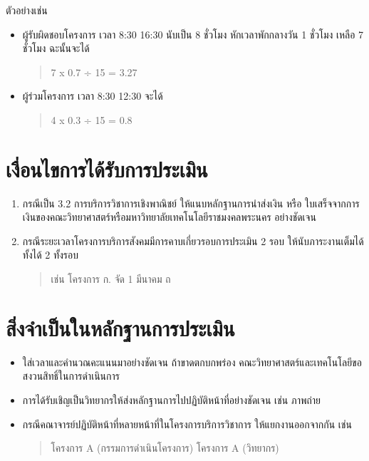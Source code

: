 \documentclass[a4paper,12pt,english]{sphinxmanual}
\begin{document}
ตัวอย่างเช่น
\begin{itemize}
\item {} 
ผู้รับผิดชอบโครงการ เวลา 8:30 \sphinxhyphen{} 16:30 นับเป็น 8 ชั่วโมง หักเวลาพักกลางวัน 1 ชั่วโมง เหลือ 7 ชั่วโมง ฉะนั้นจะได้
\begin{quote}

7 x 0.7 ÷ 15 = 3.27
\end{quote}

\item {} 
ผู้ร่วมโครงการ เวลา 8:30 \sphinxhyphen{} 12:30 จะได้
\begin{quote}

4 x 0.3 ÷ 15 = 0.8
\end{quote}

\end{itemize}


\section{เงื่อนไขการได้รับการประเมิน}
\label{\detokenize{3service:id3}}\begin{enumerate}
%
\item {} 
กรณีเป็น 3.2 การบริการวิชาการเชิงพาณิชย์ ให้แนบหลักฐานการนำส่งเงิน หรือ ใบเสร็จจากการเงินของคณะวิทยาศาสตร์หรือมหาวิทยาลัยเทคโนโลยีราชมงคลพระนคร อย่างชัดเจน

\item {} 
กรณีระยะเวลาโครงการบริการสังคมมีการคาบเกี่ยวรอบการประเมิน 2 รอบ ให้นับภาระงานเต็มได้ทั้งได้ 2 ทั้งรอบ
\begin{quote}

เช่น โครงการ ก. จัด 1 มีนาคม ถ
\end{quote}

\end{enumerate}


\section{สิ่งจำเป็นในหลักฐานการประเมิน}
\label{\detokenize{3service:id4}}\begin{itemize}
\item {} 
 ใส่เวลาและคำนวณคะแนนมาอย่างชัดเจน ถ้าขาดตกบกพร่อง คณะวิทยาศาสตร์และเทคโนโลยีขอสงวนสิทธิ์ในการดำเนินการ

\item {} 
การได้รับเชิญเป็นวิทยากรให้ส่งหลักฐานการไปปฏิบัติหน้าที่อย่างชัดเจน เช่น ภาพถ่าย

\item {} 
กรณีคณาจารย์ปฏิบัติหน้าที่หลายหน้าที่ในโครงการบริการวิชาการ ให้แยกงานออกจากกัน เช่น
\begin{quote}

โครงการ A (กรรมการดำเนินโครงการ)
โครงการ A (วิทยากร)
\end{quote}

\end{itemize}
\end{document}
